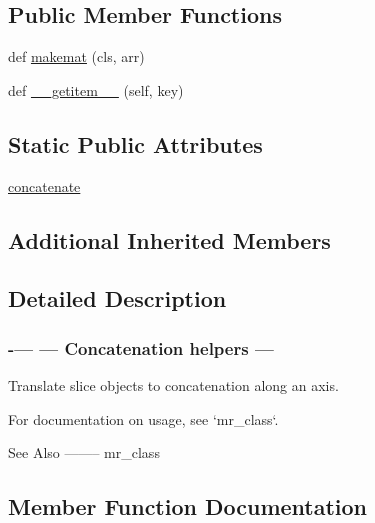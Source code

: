 \subsection*{Public Member Functions}
\begin{DoxyCompactItemize}
\item 
def \hyperlink{classnumpy_1_1ma_1_1extras_1_1MAxisConcatenator_a2fc8f8125419911fb994ab200f676883}{makemat} (cls, arr)
\item 
def \hyperlink{classnumpy_1_1ma_1_1extras_1_1MAxisConcatenator_a823f671f8b83f456adbdcc406a7c3c01}{\+\_\+\+\_\+getitem\+\_\+\+\_\+} (self, key)
\end{DoxyCompactItemize}
\subsection*{Static Public Attributes}
\begin{DoxyCompactItemize}
\item 
\hyperlink{classnumpy_1_1ma_1_1extras_1_1MAxisConcatenator_a08b40fa233a66b4fc3e572e74b54477f}{concatenate}
\end{DoxyCompactItemize}
\subsection*{Additional Inherited Members}


\subsection{Detailed Description}


 \subsubsection*{-\/--- --- Concatenation helpers --- }

\begin{DoxyVerb}Translate slice objects to concatenation along an axis.

For documentation on usage, see `mr_class`.

See Also
--------
mr_class\end{DoxyVerb}
 

\subsection{Member Function Documentation}
\mbox{\label{classnumpy_1_1ma_1_1extras_1_1MAxisConcatenator_a823f671f8b83f456adbdcc406a7c3c01}} 
